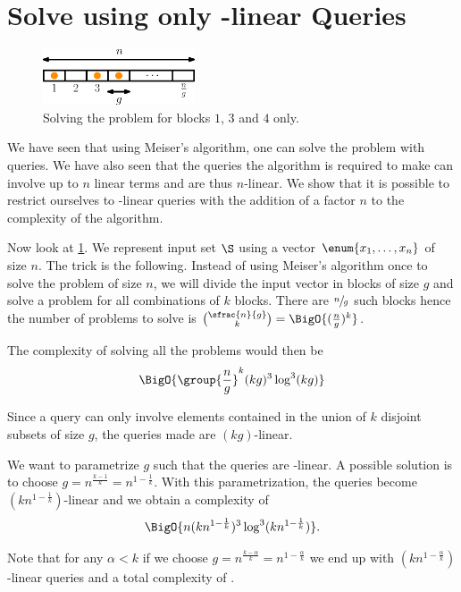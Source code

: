 \section{Solve \kSUM using only -linear Queries}


\begin{figure}
\centering
\includegraphics[width=0.4\textwidth]{fig/point-location/blocks}
\caption{Solving the problem for blocks \(1\), \(3\) and \(4\) only.}
\label{fig:point-location:on:blocks}
\end{figure}

We have seen that using Meiser's algorithm, one can solve the \kSUM problem
with  queries. We have also seen that the queries the
algorithm is required to make can involve up to \(n\) linear terms and are thus
\(n\)-linear. We show that it is possible to restrict ourselves to
-linear queries with the addition of a factor \(n\) to the complexity
of the algorithm.

Now look at \ref{fig:point-location:on:blocks}. We represent input set \(\S\)
using a vector \(\enum{x_1,\ldots,x_n}\) of size \(n\). The trick is the
following. Instead of using Meiser's algorithm once to solve the problem of
size \(n\), we will divide the input vector in blocks of size \(g\) and solve a
\kSUM problem for all combinations of \(k\) blocks. There are \(\sfrac{n}{g}\)
such blocks hence the number of problems to solve is \(\binom{\sfrac{n}{g}}{k}
= \BigO{(\frac{n}{g})^k} \).

The complexity of solving all the problems would then be
\begin{displaymath}
\BigO{\group{\frac{n}{g}}^k (kg)^3 \log^3 (kg) }
\end{displaymath}

Since a query can only involve elements contained in the union of \(k\)
disjoint subsets of size \(g\), the queries made are \((kg)\)-linear.

We want to parametrize \(g\) such that the queries are -linear. A
possible solution is to choose \(g = n^{\frac{k-1}{k}} = n^{1-\frac{1}{k}}\).
With this parametrization, the queries become \((kn^{1-\frac{1}{k}})\)-linear
and we obtain a complexity of
\begin{displaymath}
\BigO{n (kn^{1-\frac{1}{k}})^3 \log^3 (kn^{1-\frac{1}{k}}) }.
\end{displaymath}

Note that for any \(\alpha < k\) if we choose \(g = n^{\frac{k-\alpha}{k}} =
n^{1-\frac{\alpha}{k}}\) we end up with \((kn^{1-\frac{\alpha}{k}})\)-linear
queries and a total complexity of
.

